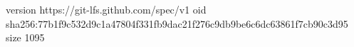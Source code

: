 version https://git-lfs.github.com/spec/v1
oid sha256:77b1f9c532d9c1a47804f331fb9dac21f276c9db9be6c6dc63861f7cb90c3d95
size 1095
